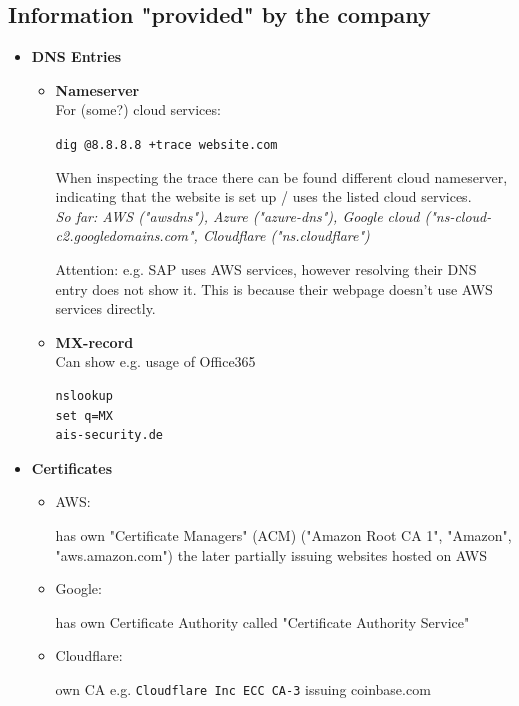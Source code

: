 \documentclass[12pt]{article}
\begin{document}
\subsection*{Information "provided" by the company}
\begin{itemize}
    \item \textbf{DNS Entries}
    \begin{itemize}
        \item \textbf{Nameserver}\\
        For (some?) cloud services:
    
        \verb|dig @8.8.8.8 +trace website.com|
        
        When inspecting the trace there can be found different cloud nameserver, indicating that the website is set up / uses the listed cloud services. \\
        \textit{So far: AWS ("awsdns"), Azure ("azure-dns"), Google cloud ("ns-cloud-c2.googledomains.com", Cloudflare ("ns.cloudflare")}
        
        Attention: e.g. SAP uses AWS services, however resolving their DNS entry does not show it. This is because their webpage doesn't use AWS services directly.
        
        \item \textbf{MX-record} \\
        Can show e.g. usage of Office365
        \begin{verbatim}
nslookup
set q=MX
ais-security.de
        \end{verbatim}
    \end{itemize}
    
    \item \textbf{Certificates}
    \begin{itemize}
        \item AWS: 
    
        has own "Certificate Managers" (ACM) ("Amazon Root CA 1", "Amazon", "aws.amazon.com") the later partially issuing websites hosted on AWS
        
        \item Google: 
    
        has own Certificate Authority called "Certificate Authority Service" 
        
        \item Cloudflare: 
    
        own CA e.g. \verb|Cloudflare Inc ECC CA-3| issuing coinbase.com
    \end{itemize}
    

\end{itemize}
\end{document}
